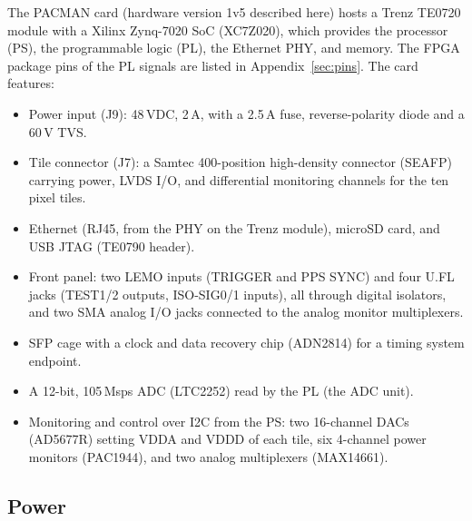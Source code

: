 \documentclass[12pt]{article}
\begin{document}
\noindent
The PACMAN card (hardware version 1v5 described here) hosts a Trenz TE0720 module with a Xilinx
Zynq-7020 SoC (XC7Z020), which provides the processor (PS), the programmable logic (PL), the
Ethernet PHY, and memory.  The FPGA package pins of the PL signals are listed in
Appendix~\ref{sec:pins}.  The card features:
\begin{itemize}
\item Power input (J9):  48\,VDC, 2\,A, with a 2.5\,A fuse, reverse-polarity diode and a
  60\,V TVS.

\item Tile connector (J7):  a Samtec 400-position high-density connector (SEAFP) carrying power, LVDS I/O, and differential monitoring channels for the ten pixel tiles.


\item Ethernet (RJ45, from the PHY on the Trenz module), microSD card, and USB JTAG (TE0790 header).

\item Front panel:  two LEMO inputs (TRIGGER and PPS SYNC) and four U.FL jacks (TEST1/2 outputs,
  ISO-SIG0/1 inputs), all through digital isolators, and two SMA analog I/O jacks connected to the analog
  monitor multiplexers.

\item SFP cage with a clock and data recovery chip (ADN2814) for a timing system endpoint.

\item A 12-bit, 105\,Msps ADC (LTC2252) read by the PL (the ADC unit).

\item Monitoring and control over I2C from the PS:  two 16-channel DACs (AD5677R) setting VDDA and VDDD of
  each tile, six 4-channel power monitors (PAC1944), and two analog multiplexers (MAX14661).

\end{itemize}

\subsection{Power}
\end{document}
